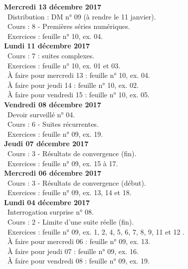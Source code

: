 \documentclass[12pt,a4paper]{article}
\begin{document}
\noindent\textbf{\bf Mercredi 13 décembre 2017}\\
\bu\ Distribution : DM n° 09 (à rendre le 11 janvier).\\
\bu\ Cours : 8 - Premières séries numériques.\\
\bu\ Exercices : feuille n° 10, ex. 04.\vspace{.4cm}\\

\noindent\textbf{Lundi 11 décembre 2017}\\
\bu\ Cours : 7 : suites complexes.\\
\bu\ Exercices : feuille n° 10, ex. 01 et 03.\\
\bu\ À faire pour mercredi 13 : feuille n° 10, ex. 04.\\
\bu\ À faire pour jeudi 14 : feuille n° 10, ex. 02.\\
\bu\ À faire pour vendredi 15 : feuille n° 10, ex. 05.\vspace{.4cm}\\

\noindent\textbf{Vendredi 08 décembre 2017}\\
\bu\ Devoir surveillé n° 04.\\
\bu\ Cours : 6 - Suites récurrentes.\\
\bu\ Exercices : feuille n° 09, ex. 19.\vspace{.4cm}\\

\noindent\textbf{Jeudi 07 décembre 2017}\\
\bu\ Cours : 3 - Résultats de convergence (fin).\\
\bu\ Exercices : feuille n° 09, ex. 15 à 17.\vspace{.4cm}\\

\noindent\textbf{\bf Mercredi 06 décembre 2017}\\
\bu\ Cours : 3 - Résultats de convergence (début).\\
\bu\ Exercices : feuille n° 09, ex. 13, 14 et 18.\vspace{.4cm}\\

\noindent\textbf{Lundi 04 décembre 2017}\\
\bu\ Interrogation surprise n° 08.\\
\bu\ Cours : 2 - Limite d'une suite réelle (fin).\\
\bu\ Exercices : feuille n° 09, ex. 1, 2, 4, 5, 6, 7, 8, 9, 11 et 12 .\\
\bu\ À faire pour mercredi 06 : feuille n° 09, ex. 13.\\
\bu\ À faire pour jeudi 07 : feuille n° 09, ex. 16.\\
\bu\ À faire pour vendredi 08 : feuille n° 09, ex. 19.\vspace{.4cm}\\
\end{document}
